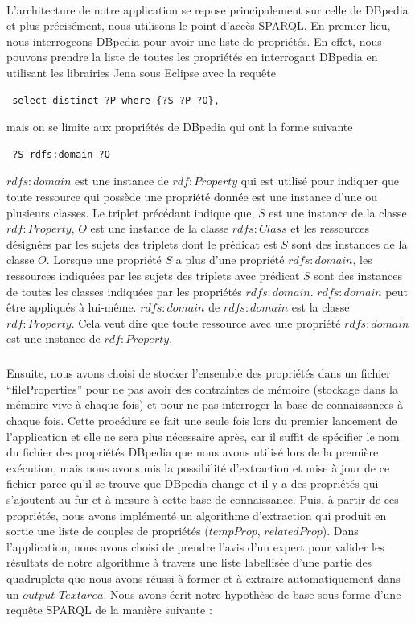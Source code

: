 \paragraph{}
L'architecture de notre application se repose principalement sur celle de DBpedia et plus précisément, nous utilisons le point d'accès SPARQL. En premier lieu, nous interrogeons DBpedia pour avoir une liste de propriétés. En effet, nous pouvons prendre la liste de toutes les propriétés en interrogant DBpedia en utilisant les librairies Jena sous Eclipse avec la requête \begin{verbatim} select distinct ?P where {?S ?P ?O},\end{verbatim}mais on se limite aux propriétés de DBpedia qui ont la forme suivante \begin{verbatim} ?S rdfs:domain ?O \end{verbatim} $rdfs{:}domain$ est une instance de $rdf{:}Property$ qui est utilisé pour indiquer que toute ressource qui possède une propriété donnée est une instance d'une ou plusieurs classes. Le triplet précédant indique que, $S$ est une instance de la classe $rdf{:}Property$, $O$ est une instance de la classe $rdfs{:}Class$ et les ressources désignées par les sujets des triplets dont le prédicat est $S$ sont des instances de la classe $O$. Lorsque une propriété $S$ a plus d'une propriété $rdfs{:}domain$, les ressources indiquées par les sujets des triplets avec prédicat $S$ sont des instances de toutes les classes indiquées par les propriétés $rdfs{:}domain$. $rdfs{:}domain$ peut être appliqués à lui-même. $rdfs{:}domain$ de $rdfs{:}domain$ est la classe $rdf{:}Property$. Cela veut dire que toute ressource avec une propriété $rdfs{:}domain$ est une instance de $rdf{:}Property$. 
\subparagraph{}
Ensuite, nous avons choisi de stocker l'ensemble des propriétés dans un fichier ``fileProperties'' pour ne pas avoir des contraintes de mémoire (stockage dans la mémoire vive à chaque fois) et pour ne pas interroger la base de connaissances à chaque fois. Cette procédure se fait une seule fois lors du premier lancement de l'application et elle ne sera plus nécessaire après, car il suffit de spécifier le nom du fichier des propriétés DBpedia que nous avons utilisé lors de la première exécution, mais nous avons mis la possibilité d'extraction et mise à jour de ce fichier parce qu'il se trouve que DBpedia change et il y a des propriétés qui s'ajoutent au fur et à mesure à cette base de connaissance. Puis, à partir de ces propriétés, nous avons implémenté un algorithme d'extraction qui produit en sortie une liste de couples de propriétés ($tempProp$, $relatedProp$). Dans l'application, nous avons choisi de prendre l'avis d'un expert pour valider les résultats de notre algorithme à travers une liste labellisée d'une partie des quadruplets que nous avons réussi à former et à extraire automatiquement dans un $output$ $Textarea$. Nous avons écrit notre hypothèse de base sous forme d'une requête SPARQL de la manière suivante :
